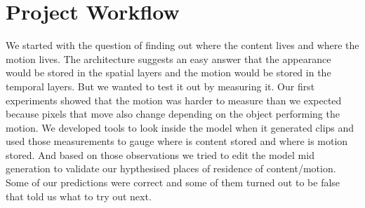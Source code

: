 \documentclass[twoside,english]{article}
\begin{document}
\section{Project Workflow} \label{sec:workflow}

We started with the question of finding out where the content lives and where the motion lives.
The architecture suggests an easy answer that the appearance would be stored in the spatial layers and 
the motion would be stored in the temporal layers. But we wanted to test it out by measuring it. 
Our first experiments showed that the motion was harder to measure than we expected because pixels 
that move also change depending on the object performing the motion. We developed tools to look inside
the model when it generated clips and used those measurements to gauge where is content stored and
where is motion stored. And based on those observations we tried to edit the model mid generation to validate
our hypthesised places of residence of content/motion. Some of our predictions were correct
and some of them turned out to be false that told us what to try out next.
\end{document}
